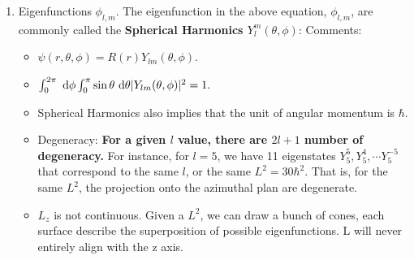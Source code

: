 \documentclass{school-22.101-notes}
\begin{document}
\begin{enumerate}
\item Eigenfunctions $\phi_{l,m}$. The eigenfunction in the above equation, $\phi_{l,m}$, are commonly called the \textbf{Spherical Harmonics $Y_l^m (\theta, \phi)$}:
  Comments:
  \begin{itemize}
  \item $\psi( r, \theta, \phi) = R(r) Y_{lm} (\theta, \phi)$. 
  \item $\int_0^{2\pi} \mbox{ }\mathrm{d} \phi \int_0^{\pi} \sin \theta \mbox{ }\mathrm{d} \theta |Y_{lm} (\theta, \phi) |^2 = 1.$
  \item Spherical Harmonics also implies that the unit of angular momentum is $\hbar$.
  \item Degeneracy: \textbf{For a given $l$ value, there are $2l+1$ number of degeneracy.} For instance, for $l=5$, we have 11 eigenstates $Y_5^5, Y_5^4, \cdots Y_5^{-5}$ that correspond to the same $l$, or the same $L^2 = 30 \hbar^2$. That is, for the same $L^2$, the projection onto the azimuthal plan are degenerate.  
  \item $L_z$ is not continuous. Given a $L^2$, we can draw a bunch of cones, each surface describe the superposition of possible eigenfunctions. L will never entirely align with the z axis. 
  \end{itemize}
\end{enumerate}
\end{document}
